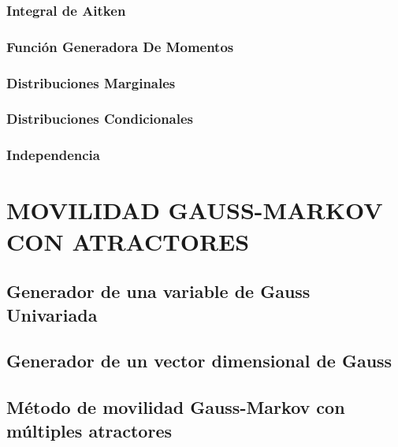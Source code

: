 \subsubsection{Integral de Aitken}
\subsubsection{Función Generadora De Momentos}
\subsubsection{Distribuciones Marginales}
\subsubsection{Distribuciones Condicionales}
\subsubsection{Independencia}

\section{MOVILIDAD GAUSS-MARKOV CON ATRACTORES}
\subsection{Generador de una variable de Gauss Univariada}
\subsection{Generador de un vector dimensional de Gauss}
\subsection{Método de movilidad Gauss-Markov con múltiples atractores}



